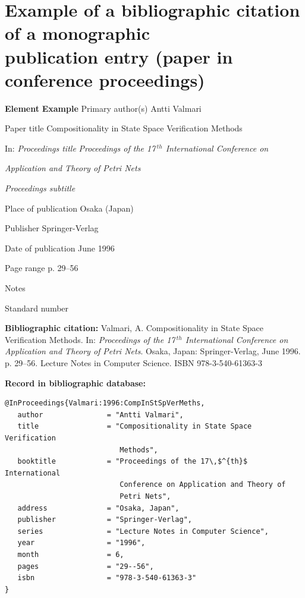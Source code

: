 
\newpage
\section*{Example of a bibliographic citation of a monographic \\
publication entry (paper in conference proceedings)}
\label{pr-sbornik-clanek}
\begin{tabbing}
\zarazky
\textbf{Element} \> \textbf{Example} \odradkovani
Primary author(s) \>
Antti {\sc Valmari}

\odradkovani
Paper title \>
Compositionality in State Space Verification Methods

\odradkovani
In: {\em Proceedings title} \>
{\em Proceedings of the 17\,$^{th}$ International Conference on}

   \odradkovani \>
   {\em Application and Theory of Petri Nets}

\odradkovani
{\em Proceedings subtitle}\footnotemark[1] \>

\odradkovani
Place of publication \>
Osaka (Japan)

\odradkovani
Publisher \>
Springer-Verlag

\odradkovani
Date of publication \>
June 1996

\odradkovani
Page range \>
p. 29--56

\odradkovani
Notes\footnotemark[2] \>

\odradkovani
Standard number \>

\odradkovani
\end{tabbing}

\noindent \textbf{Bibliographic citation:} \odradkovani
{\sc Valmari}, A. Compositionality in State Space Verification Methods.
In: {\em Proceedings of the 17\,$^{th}$ International Conference on Application and
Theory of Petri Nets}. Osaka, Japan: Springer-Verlag, June 1996. p. 29--56. Lecture Notes in Computer Science. ISBN 978-3-540-61363-3

\bigskip \bigskip
\noindent \textbf{Record in bibliographic database:}
\vspace{-0.5em}
\begin{verbatim}
@InProceedings{Valmari:1996:CompInStSpVerMeths,
   author               = "Antti Valmari",
   title                = "Compositionality in State Space Verification
                           Methods",
   booktitle            = "Proceedings of the 17\,$^{th}$ International
                           Conference on Application and Theory of
                           Petri Nets",
   address              = "Osaka, Japan",
   publisher            = "Springer-Verlag",
   series               = "Lecture Notes in Computer Science",
   year                 = "1996",
   month                = 6,
   pages                = "29--56",
   isbn                 = "978-3-540-61363-3"
}
\end{verbatim}

